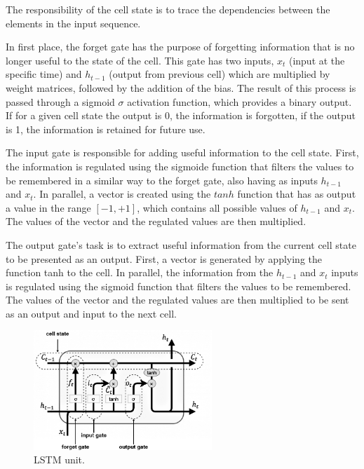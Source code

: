 The responsibility of the cell state is to trace the dependencies between the elements in the input sequence. 

In first place, the forget gate has the purpose of forgetting information that is no longer useful to the state of the cell. This gate has two inputs, $x_t$ (input at the specific time) and $h_{t-1}$ (output from previous cell) which are multiplied by weight matrices, followed by the addition of the bias. The result of this process is passed through a sigmoid $\sigma$ activation function, which provides a binary output. If for a given cell state the output is 0, the information is forgotten, if the output is 1, the information is retained for future use.

The input gate is responsible for adding useful information to the cell state. First, the information is regulated using the sigmoide function that filters the values to be remembered in a similar way to the forget gate, also having as inputs $h_{t-1}$ and $x_t$. In parallel, a vector is created using the $tanh$ function that has as output a value in the range $ [-1, +1]$, which contains all possible values of $h_{t-1}$ and $x_t$. The values of the vector and the regulated values are then multiplied. 

The output gate's task is to extract useful information from the current cell state to be presented as an output. First, a vector is generated by applying the function tanh to the cell. In parallel, the information from the $h_{t-1}$ and $x_t$ inputs is regulated using the sigmoid function that filters the values to be remembered. The values of the vector and the regulated values are then multiplied to be sent as an output and input to the next cell.

 
\begin{figure}[h!]
    \centering
    \begin{center}
    \includegraphics[width=0.6\textwidth]{Images/LSTM_cell_detailed.png}
    \caption{LSTM unit.}
    \label{lstm}
    \end{center}
\end{figure}

